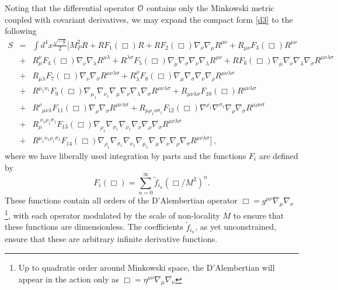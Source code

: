 Noting that the differential operator ${\cal O}$ contains only the Minkowski metric coupled with covariant derivatives, we may expand the compact form \eqref{d3} to the following
\begin{eqnarray}
S&=&\int d^4x\frac{\sqrt{-g}}{2}\Big[M_P^2R+R F_1(\Box)R+R F_2(\Box)\nabla_{\nu}\nabla_{\mu}R^{\mu\nu}+R_{\mu\nu} F_3(\Box)R^{\mu\nu}\nonumber \\ 
&+&R_{\mu}^{\nu} F_4(\Box)\nabla_{\nu}\nabla_{\lambda}R^{\mu\lambda}+R^{\lambda\sigma} F_5(\Box)\nabla_{\mu}\nabla_{\sigma}\nabla_{\nu}\nabla_{\lambda}R^{\mu\nu}+R F_6(\Box)\nabla_{\mu}\nabla_{\nu}\nabla_{\lambda}\nabla_{\sigma}R^{\mu\nu\lambda\sigma}\nonumber \\ 
&+&R_{\mu\lambda} F_7(\Box)\nabla_{\nu}\nabla_{\sigma}R^{\mu\nu\lambda\sigma}+R_{\lambda}^{\rho} F_8(\Box)\nabla_{\mu}\nabla_{\sigma}\nabla_{\nu}\nabla_{\rho}R^{\mu\nu\lambda\sigma} \nonumber \\ 
& + &R^{\mu_1\nu_1} F_9(\Box)\nabla_{\mu_1}\nabla_{\nu_1}\nabla_{\mu}\nabla_{\nu}\nabla_{\lambda}\nabla_{\sigma}R^{\mu\nu\lambda\sigma}+ R_{\mu\nu\lambda\sigma} F_{10}(\Box)R^{\mu\nu\lambda\sigma} \nonumber \\ 
& + & R^{\rho}{ }_{\mu\nu\lambda} F_{11}(\Box)\nabla_{\rho}\nabla_{\sigma}R^{\mu\nu\lambda\sigma}+ R_{\mu\rho_1 \nu\sigma_1} F_{12}(\Box)\nabla^{\rho_1}\nabla^{\sigma_1}\nabla_{\rho}\nabla_{\sigma}R^{\mu\rho\nu\sigma}
\nonumber\\ &+&
R_{\mu}^{\;\nu_1\rho_1\sigma_1}F_{13}(\Box)\nabla_{\rho_1}\nabla_{\sigma_1}\nabla_{\nu_1}\nabla_{\nu}\nabla_{\rho}\nabla_{\sigma}R^{\mu\nu\lambda\sigma} \nonumber \\ 
& + & R^{\mu_1\nu_1\rho_1\sigma_1} F_{14}(\Box)\nabla_{\rho_1}\nabla_{\sigma_1}
\nabla_{\nu_1}\nabla_{\mu_1}\nabla_{\mu}\nabla_{\nu}\nabla_{\rho}\nabla_{\sigma}R^{\mu\nu\lambda\sigma}\Big]\,,
\label{d4}
\end{eqnarray} where we have liberally used integration by parts and the functions $F_i$ are defined by
 \[
 \label{Fintro}
 F_i(\Box)=\sum^{\infty}_{n=0}{\tilde f}_{i_n}(\Box/M^2)^n
 .\]
These functions contain all orders of the D'Alembertian operator $\Box=g^{\mu\nu}\nabla_\mu \nabla_\nu$\footnote{Up to quadratic order around Minkowski space, the D'Alembertian will appear in the action only as $\Box=\eta^{\mu\nu}\nabla_\mu \nabla_\nu$}, with each operator modulated by the scale of non-locality $M$ to ensure that these functions are dimensionless. The coefficients ${\tilde f}_{i_n}$, as yet unconstrained, ensure that these are arbitrary infinite derivative functions.

